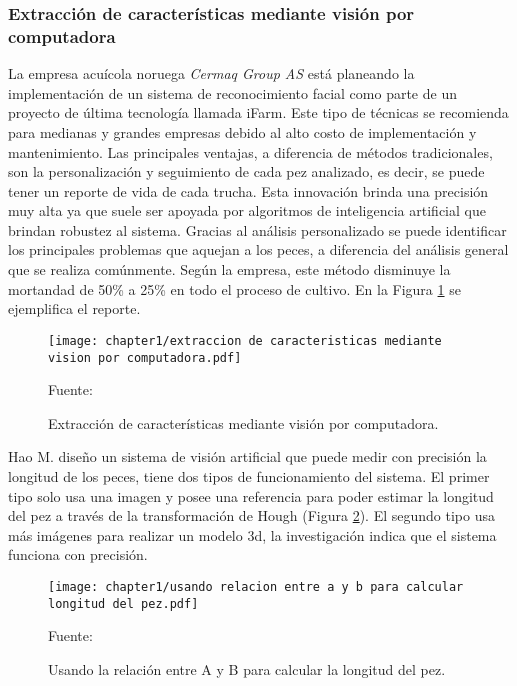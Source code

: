 \subsubsection{Extracción de características mediante visión por computadora}

La empresa acuícola noruega \textit{Cermaq Group AS} está planeando la implementación de un sistema de reconocimiento facial como parte de un proyecto de última tecnología llamada iFarm.\cite{Daley2018} Este tipo de técnicas se recomienda para medianas y grandes empresas debido al alto costo de implementación y mantenimiento. Las principales ventajas, a diferencia de métodos tradicionales, son la personalización y seguimiento de cada pez analizado, es decir, se puede tener un reporte de vida de cada trucha. Esta innovación brinda una precisión muy alta ya que suele ser apoyada por algoritmos de inteligencia artificial que brindan robustez al sistema. Gracias al análisis personalizado se puede identificar los principales problemas que aquejan a los peces, a diferencia del análisis general que se realiza comúnmente. Según la empresa, este método disminuye la mortandad de 50\% a 25\% en todo el proceso de cultivo. En la Figura \ref{fig:extraccion de caracteristicas mediante vision por computadora} se ejemplifica el reporte.

\begin{figure}[H]
	\centering
	\texttt{[image: chapter1/extraccion de caracteristicas mediante vision por computadora.pdf]}
	\caption{Extracción de características mediante visión por computadora.}
	Fuente: \cite{Biosort2016}
	\label{fig:extraccion de caracteristicas mediante vision por computadora}
\end{figure}

Hao M. diseño un sistema de visión artificial que puede medir con precisión la longitud de los peces, tiene dos tipos de funcionamiento del sistema. El primer tipo solo usa una imagen y posee una referencia para poder estimar la longitud del pez a través de la transformación de Hough (Figura \ref{fig:usando relacion entre a y b para calcular longitud del pez}). El segundo tipo usa más imágenes para realizar un modelo 3d, la investigación indica que el sistema funciona con precisión. \cite[p.~4-5]{Niu2018}

\begin{figure}[H]
	\centering
	\texttt{[image: chapter1/usando relacion entre a y b para calcular longitud del pez.pdf]}
	\caption{Usando la relación  entre A y B para calcular la longitud del pez.}
	Fuente: \cite{Hao2016}
	\label{fig:usando relacion entre a y b para calcular longitud del pez}
\end{figure}

